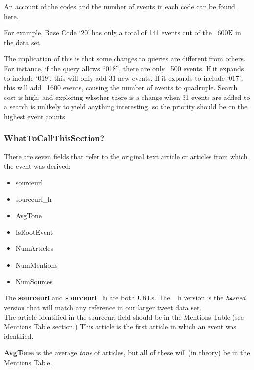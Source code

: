 \par \href{https://docs.google.com/spreadsheets/d/1z2bK0SD826bL5eq-5ZhLCF3rnJoVnW_fJS1wBEAx03Y/edit?usp=sharing}{An account of the codes and the number of events in each code can be found here.}

\par For example, Base Code ‘20’ has only a total of 141 events out of the ~600K in the data set.

The implication of this is that some changes to queries are different from others. For instance, if the query allows “018”, there are only ~500 events.
If it expands to include ‘019’, this will only add 31 new events.
If it expands to include ‘017’, this will add ~1600 events, causing the number of events to quadruple. 
Search cost is high, and exploring whether there is a change when 31 events are added to a search is unlikely to yield anything interesting, so the priority should be on the highest event counts. %

\subsubsection{WhatToCallThisSection?} 
There are seven fields that refer to the original text article or articles from which the event was derived:
\begin{itemize} \item sourceurl \item sourceurl\_h \item AvgTone \item IsRootEvent \item NumArticles \item NumMentions \item NumSources \end{itemize}

\par The \textbf{sourceurl} and \textbf{sourceurl\_h} are both URLs.
The \_h version is the \emph{hashed} version that will match any reference in our larger tweet data set.
\\The article identified in the sourceurl field should be in the Mentions Table (see \hyperlink{section.4.2}{Mentions Table} section.)
This article is the first article in which an event was identified.
 
 \par \textbf{AvgTone} is the average \emph{tone} of articles, but all of these will (in theory) be in the \hyperlink{section.4.2}{Mentions Table}. %
 
